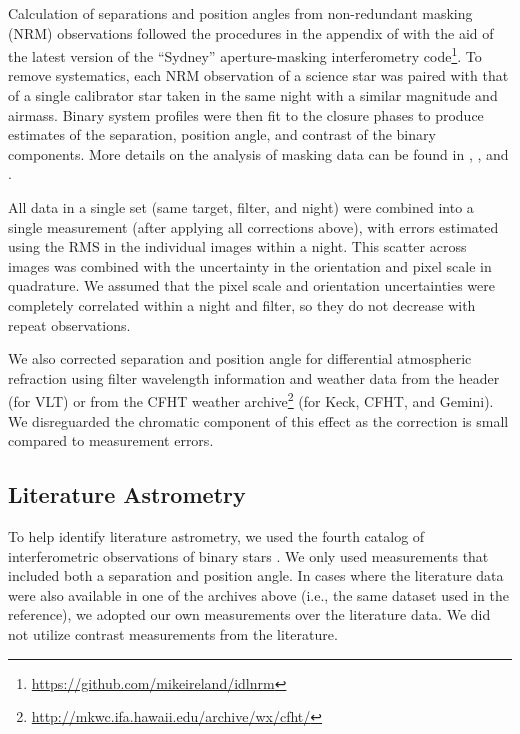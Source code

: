 \documentclass[twocolumn]{aastex62}
\begin{document}
Calculation of separations and position angles from non-redundant masking (NRM) observations followed the procedures in the appendix of \citet{Kraus2008} with the aid of the latest version of the ``Sydney'' aperture-masking interferometry code\footnote{\href{https://github.com/mikeireland/idlnrm}{https://github.com/mikeireland/idlnrm}}. To remove systematics, each NRM observation of a science star was paired with that of a single calibrator star taken in the same night with a similar magnitude and airmass. Binary system profiles were then fit to the closure phases to produce estimates of the separation, position angle, and contrast of the binary components. More details on the analysis of masking data can be found in \citet{2006ApJ...650L.131L}, \citet{Kraus2008}, and \citet{2012ApJ...744..120E}.

All data in a single set (same target, filter, and night) were combined into a single measurement (after applying all corrections above), with errors estimated using the RMS in the individual images within a night. This scatter across images was combined with the uncertainty in the orientation and pixel scale in quadrature. We assumed that the pixel scale and orientation uncertainties were completely correlated within a night and filter, so they do not decrease with repeat observations. 

We also corrected separation and position angle for differential atmospheric refraction \citep[DAR, ][]{2010SPIE.7736E..1IL} using filter wavelength information and weather data from the header (for VLT) or from the CFHT weather archive\footnote{\href{http://mkwc.ifa.hawaii.edu/archive/wx/cfht/}{http://mkwc.ifa.hawaii.edu/archive/wx/cfht/}} (for Keck, CFHT, and Gemini). We disreguarded the chromatic component of this effect as the correction is small compared to measurement errors. 


\subsection{Literature Astrometry}\label{sec:litas}

To help identify literature astrometry, we used the fourth catalog of interferometric observations of binary stars \citep[INT4,][]{Hartkopf:2001}. We only used measurements that included both a separation and position angle. In cases where the literature data were also available in one of the archives above (i.e., the same dataset used in the reference), we adopted our own measurements over the literature data. We did not utilize contrast measurements from the literature.
\end{document}
